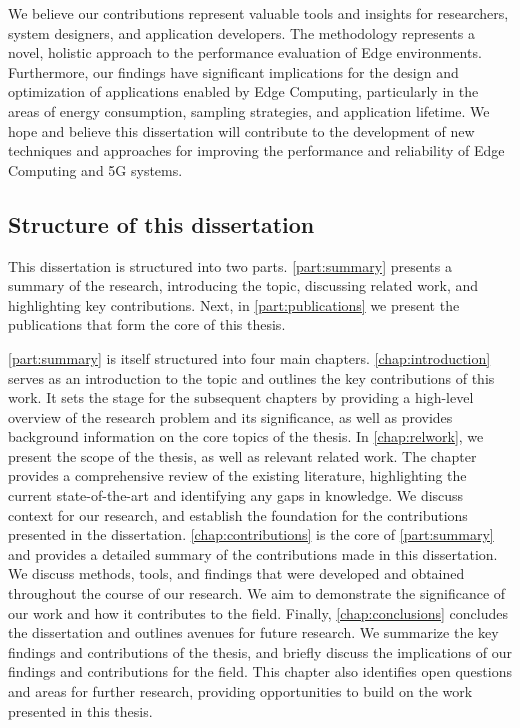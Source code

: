 We believe our contributions represent valuable tools and insights for researchers, system designers, and application developers.
The methodology represents a novel, holistic approach to the performance evaluation of Edge environments.
Furthermore, our findings have significant implications for the design and optimization of applications enabled by Edge Computing, particularly in the areas of energy consumption, sampling strategies, and application lifetime.
We hope and believe this dissertation will contribute to the development of new techniques and approaches for improving the performance and reliability of Edge Computing and 5G systems.

\subsection{Structure of this dissertation}

This dissertation is structured into two parts.
\cref{part:summary} presents a summary of the research, introducing the topic, discussing related work, and highlighting key contributions.
Next, in \cref{part:publications} we present the publications that form the core of this thesis.

\cref{part:summary} is itself structured into four main chapters.
\cref{chap:introduction} serves as an introduction to the topic and outlines the key contributions of this work.
It sets the stage for the subsequent chapters by providing a high-level overview of the research problem and its significance, as well as provides background information on the core topics of the thesis.
In \cref{chap:relwork}, we present the scope of the thesis, as well as relevant related work.
The chapter provides a comprehensive review of the existing literature, highlighting the current state-of-the-art and identifying any gaps in knowledge.
We discuss context for our research, and establish the foundation for the contributions presented in the dissertation.
\cref{chap:contributions} is the core of \cref{part:summary} and provides a detailed summary of the contributions made in this dissertation.
We discuss methods, tools, and findings that were developed and obtained throughout the course of our research.
We aim to demonstrate the significance of our work and how it contributes to the field.
Finally, \cref{chap:conclusions} concludes the dissertation and outlines avenues for future research.
We summarize the key findings and contributions of the thesis, and briefly discuss the implications of our findings and contributions for the field.
This chapter also identifies open questions and areas for further research, providing opportunities to build on the work presented in this thesis.